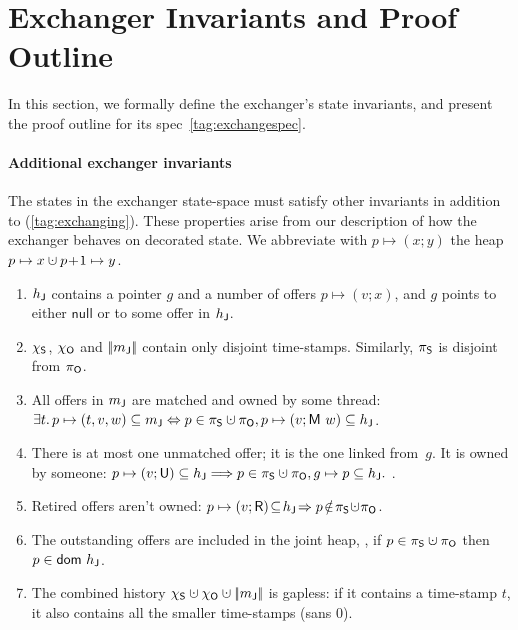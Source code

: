
\section{Exchanger Invariants and Proof Outline}
\label{app:exch}

In this section, we formally define the exchanger's state invariants,
and present the proof outline for its spec~\eqref{tag:exchangespec}.

%

\paragraph{Additional exchanger invariants}

The states in the exchanger state-space must satisfy other invariants
in addition to (\ref{tag:exchanging}). These properties arise from our
description of how the exchanger behaves on decorated state. We
abbreviate with $p \mapsto (x; y)$ the heap
$p \mapsto x \hunion p\!+\!1 \mapsto y$.

\begin{enumerate}[label=(\roman*)]
\item\label{exP} $h_{\mathsf{J}}$ contains a pointer $g$ and a number of
  offers $p \mapsto (v; x)$, and $g$ points to either $\mathsf{null}$
  or to some offer in $h_{\mathsf{J}}$.

\item $\chi_{\mathsf{S}}$, $\chi_{\mathsf{O}}$ and $|\!|{{m_{\mathsf{J}}}}|\!|$ contain only
  disjoint time-stamps. Similarly, $\pi_{\mathsf{S}}$ is disjoint from $\pi_{\mathsf{O}}$.

\item\label{matched} All offers in ${m_{\mathsf{J}}}$ are matched and owned
  by some thread:
%
  {\small$\exists t\ldot p \mapsto (t, v, w) \subseteq \pending
    \Leftrightarrow p \in \perms \hunion \permo, p \mapsto (v;
    \Matched w) \subseteq \heapj $}.

\item There is at most one unmatched offer; it is the one linked
  from~$g$. It is owned by someone:
%
  {\small{
      $p \mapsto (v; \Unmatched) \subseteq \heapj \Longrightarrow p
      \in \perms \hunion \permo, g \mapsto p \subseteq \heapj.  $ }}.

\item Retired offers aren't owned:
  {\small{$p \mapsto (v; \Retired)\!\subseteq\!\heapj\!\Rightarrow
    p\!\notin\!\perms\!\hunion\!\permo$}}.

\item The outstanding offers are included in the joint heap, \ie, if
  $p \in \perms \hunion \permo$ then $p \in \mathsf{dom}\ h_{\mathsf{J}}$.

\item\label{ex:gapless} The combined history
  $\hists \hunion \histo \hunion \mygather{\pending}$ is gapless: if
  it contains a time-stamp $t$, it also contains all the smaller
  time-stamps (sans 0).

\end{enumerate}

